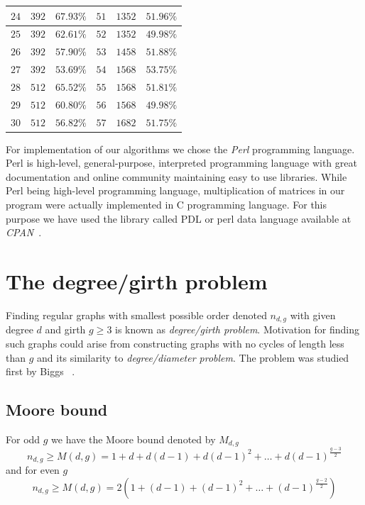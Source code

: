 \documentclass[a4paper,12pt,oneside]{report}%
\begin{document}
\begin{center}
{\begin{tabular}{| l | l | l | l | l | l |}
			$24$ & $392$ & $67.93\%$ &       			$51$ & $1352$ & $51.96\%$ \\ \hline
			$25$ & $392$ & $62.61\%$ &       			$52$ & $1352$ & $49.98\%$ \\ \hline
			$26$ & $392$ & $57.90\%$ &       			$53$ & $1458$ & $51.88\%$ \\ \hline
			$27$ & $392$ & $53.69\%$ &       			$54$ & $1568$ & $53.75\%$ \\ \hline
			$28$ & $512$ & $65.52\%$ &       			$55$ & $1568$ & $51.81\%$ \\ \hline
			$29$ & $512$ & $60.80\%$ &       			$56$ & $1568$ & $49.98\%$ \\ \hline
			$30$ & $512$ & $56.82\%$ &       			$57$ & $1682$ & $51.75\%$ \\ \hline
		\end{tabular}
	}
\end{center}

For implementation of our algorithms we chose the {\em Perl} programming language. Perl is high-level, general-purpose, interpreted programming language with great documentation and online community maintaining easy to use libraries. While Perl being high-level programming language, multiplication of matrices in our program were actually implemented in C programming language. For this purpose we have used the library called PDL or perl data language available at {\em CPAN}~\cite{CPAN}.

\section{The degree/girth problem}
Finding regular graphs with smallest possible order denoted $n_{d,g}$ with given degree $d$ and girth $g\geq3$ is known as {\em degree/girth problem}. Motivation for finding such graphs could arise from constructing graphs with no cycles of length less than $g$ and its similarity to {\em degree/diameter problem}. The problem was studied first by Biggs ~\cite{Biggs}.
\subsection{Moore bound}
For odd $g$ we have the Moore bound denoted by $M_{d,g}$
\begin{equation*}
	n_{d,g} \geq M(d,g) = 1 + d + d(d - 1) + d(d - 1)^{2} + \dots + d(d - 1)^{\frac{g-3}{2}}
\end{equation*}	
and for even $g$
\begin{equation*}
	n_{d,g} \geq M(d,g) = 2(1 + (d - 1) + (d - 1)^{2} + \dots + (d - 1)^{\frac{g-2}{2}})
\end{equation*}	
\end{document}
